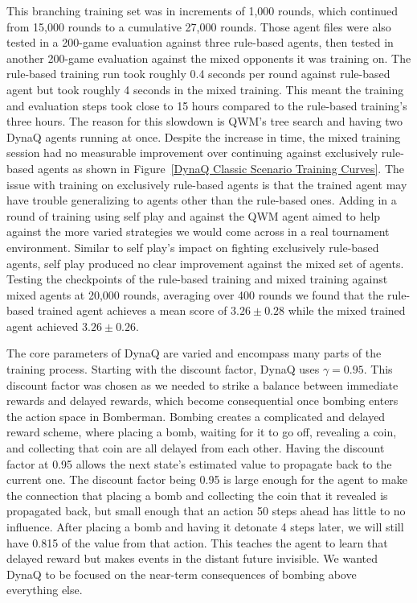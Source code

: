\documentclass[article, 10pt]{IEEEtran}
\begin{document}
This branching training set was in increments of 1,000 rounds, which continued from 15,000 rounds to a cumulative 27,000 rounds. Those agent files were also tested in a 200-game evaluation against three rule-based agents, then tested in another 200-game evaluation against the mixed opponents it was training on. The rule-based training run took roughly 0.4 seconds per round against rule-based agent but took roughly 4 seconds in the mixed training. This meant the training and evaluation steps took close to 15 hours compared to the rule-based training's three hours. The reason for this slowdown is QWM's tree search and having two DynaQ agents running at once. Despite the increase in time, the mixed training session had no measurable improvement over continuing against exclusively rule-based agents as shown in Figure~\ref{DynaQ Classic Scenario Training Curves}. The issue with training on exclusively rule-based agents is that the trained agent may have trouble generalizing to agents other than the rule-based ones. Adding in a round of training using self play and against the QWM agent aimed to help against the more varied strategies we would come across in a real tournament environment. Similar to self play's impact on fighting exclusively rule-based agents, self play produced no clear improvement against the mixed set of agents. Testing the checkpoints of the rule-based training and mixed training against mixed agents at 20,000 rounds, averaging over 400 rounds we found that the rule-based trained agent achieves a mean score of $3.26 \pm 0.28$ while the mixed trained agent achieved $3.26 \pm 0.26$.

The core parameters of DynaQ are varied and encompass many parts of the training process. Starting with the discount factor, DynaQ uses $\gamma = 0.95$. This discount factor was chosen as we needed to strike a balance between immediate rewards and delayed rewards, which become consequential once bombing enters the action space in Bomberman. Bombing creates a complicated and delayed reward scheme, where placing a bomb, waiting for it to go off, revealing a coin, and collecting that coin are all delayed from each other. Having the discount factor at 0.95 allows the next state's estimated value to propagate back to the current one. The discount factor being 0.95 is large enough for the agent to make the connection that placing a bomb and collecting the coin that it revealed is propagated back, but small enough that an action 50 steps ahead has little to no influence. After placing a bomb and having it detonate 4 steps later, we will still have 0.815 of the value from that action. This teaches the agent to learn that delayed reward but makes events in the distant future invisible. We wanted DynaQ to be focused on the near-term consequences of bombing above everything else. 
\end{document}
